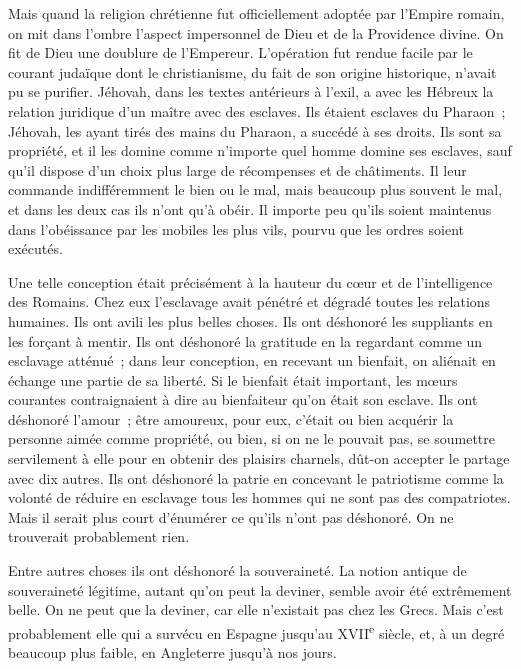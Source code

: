 \documentclass[french,twoside]{book} %
\begin{document}
Mais quand la religion chrétienne fut officiellement adoptée par l'Empire romain, on mit dans l'ombre l'aspect impersonnel de Dieu et de la Providence divine. On fit de Dieu une doublure de l'Empereur. L'opération fut rendue facile par le courant judaïque dont le christianisme, du fait de son origine historique, n'avait pu se purifier. Jéhovah, dans les textes antérieurs à l'exil, a avec les Hébreux la relation juridique d'un maître avec des esclaves. Ils étaient esclaves du Pharaon ; Jéhovah, les ayant tirés des mains du Pharaon, a succédé à ses droits. Ils sont sa propriété, et il les domine comme n'importe quel homme domine ses esclaves, sauf qu'il dispose d'un choix plus large de récompenses et de châtiments. Il leur commande indifféremment le bien ou le mal, mais beaucoup plus souvent le mal, et dans les deux cas ils n'ont qu'à obéir. Il importe peu qu'ils soient maintenus dans l'obéissance par les mobiles les plus vils, pourvu que les ordres soient exécutés.\par
Une telle conception était précisément à la hauteur du cœur et de l'intelligence des Romains. Chez eux l'esclavage avait pénétré et dégradé toutes les relations humaines. Ils ont avili les plus belles choses. Ils ont déshonoré les suppliants en les forçant à mentir. Ils ont déshonoré la gratitude en la regardant comme un esclavage atténué ; dans leur conception, en recevant un bienfait, on aliénait en échange une partie de sa liberté. Si le bienfait était important, les mœurs courantes contraignaient à dire au bienfaiteur qu'on était son esclave. Ils ont déshonoré l'amour ; être amoureux, pour eux, c'était ou bien acquérir la personne aimée comme propriété, ou bien, si on ne le pouvait pas, se soumettre servilement à elle pour en obtenir des plaisirs charnels, dût-on accepter le partage avec dix autres. Ils ont déshonoré la patrie en concevant le patriotisme comme la volonté de réduire en esclavage tous les hommes qui ne sont pas des compatriotes. Mais il serait plus court d'énumérer ce qu'ils n'ont pas déshonoré. On ne trouverait probablement rien.\par
Entre autres choses ils ont déshonoré la souveraineté. La notion antique de souveraineté légitime, autant qu'on peut la deviner, semble avoir été extrêmement belle. On ne peut que la deviner, car elle n'existait pas chez les Grecs. Mais c'est probablement elle qui a survécu en Espagne jusqu'au XVII\textsuperscript{e} siècle, et, à un degré beaucoup plus faible, en Angleterre jusqu'à nos jours.\par
\end{document}
